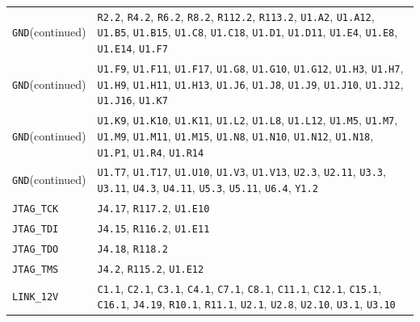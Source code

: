 \documentclass[11pt,a4paper]{article}
\begin{document}
\begin{longtable}{@{}P{49mm}P{123mm}@{}}
\nolinkurl{GND}\newline (continued) & \nolinkurl{R2.2}, \nolinkurl{R4.2}, \nolinkurl{R6.2}, \nolinkurl{R8.2}, \nolinkurl{R112.2}, \nolinkurl{R113.2}, \nolinkurl{U1.A2}, \nolinkurl{U1.A12}, \nolinkurl{U1.B5}, \nolinkurl{U1.B15}, \nolinkurl{U1.C8}, \nolinkurl{U1.C18}, \nolinkurl{U1.D1}, \nolinkurl{U1.D11}, \nolinkurl{U1.E4}, \nolinkurl{U1.E8}, \nolinkurl{U1.E14}, \nolinkurl{U1.F7} \\
\nolinkurl{GND}\newline (continued) & \nolinkurl{U1.F9}, \nolinkurl{U1.F11}, \nolinkurl{U1.F17}, \nolinkurl{U1.G8}, \nolinkurl{U1.G10}, \nolinkurl{U1.G12}, \nolinkurl{U1.H3}, \nolinkurl{U1.H7}, \nolinkurl{U1.H9}, \nolinkurl{U1.H11}, \nolinkurl{U1.H13}, \nolinkurl{U1.J6}, \nolinkurl{U1.J8}, \nolinkurl{U1.J9}, \nolinkurl{U1.J10}, \nolinkurl{U1.J12}, \nolinkurl{U1.J16}, \nolinkurl{U1.K7} \\
\nolinkurl{GND}\newline (continued) & \nolinkurl{U1.K9}, \nolinkurl{U1.K10}, \nolinkurl{U1.K11}, \nolinkurl{U1.L2}, \nolinkurl{U1.L8}, \nolinkurl{U1.L12}, \nolinkurl{U1.M5}, \nolinkurl{U1.M7}, \nolinkurl{U1.M9}, \nolinkurl{U1.M11}, \nolinkurl{U1.M15}, \nolinkurl{U1.N8}, \nolinkurl{U1.N10}, \nolinkurl{U1.N12}, \nolinkurl{U1.N18}, \nolinkurl{U1.P1}, \nolinkurl{U1.R4}, \nolinkurl{U1.R14} \\
\nolinkurl{GND}\newline (continued) & \nolinkurl{U1.T7}, \nolinkurl{U1.T17}, \nolinkurl{U1.U10}, \nolinkurl{U1.V3}, \nolinkurl{U1.V13}, \nolinkurl{U2.3}, \nolinkurl{U2.11}, \nolinkurl{U3.3}, \nolinkurl{U3.11}, \nolinkurl{U4.3}, \nolinkurl{U4.11}, \nolinkurl{U5.3}, \nolinkurl{U5.11}, \nolinkurl{U6.4}, \nolinkurl{Y1.2} \\
\nolinkurl{JTAG_TCK} & \nolinkurl{J4.17}, \nolinkurl{R117.2}, \nolinkurl{U1.E10} \\
\nolinkurl{JTAG_TDI} & \nolinkurl{J4.15}, \nolinkurl{R116.2}, \nolinkurl{U1.E11} \\
\nolinkurl{JTAG_TDO} & \nolinkurl{J4.18}, \nolinkurl{R118.2} \\
\nolinkurl{JTAG_TMS} & \nolinkurl{J4.2}, \nolinkurl{R115.2}, \nolinkurl{U1.E12} \\
\nolinkurl{LINK_12V} & \nolinkurl{C1.1}, \nolinkurl{C2.1}, \nolinkurl{C3.1}, \nolinkurl{C4.1}, \nolinkurl{C7.1}, \nolinkurl{C8.1}, \nolinkurl{C11.1}, \nolinkurl{C12.1}, \nolinkurl{C15.1}, \nolinkurl{C16.1}, \nolinkurl{J4.19}, \nolinkurl{R10.1}, \nolinkurl{R11.1}, \nolinkurl{U2.1}, \nolinkurl{U2.8}, \nolinkurl{U2.10}, \nolinkurl{U3.1}, \nolinkurl{U3.10} \\

\end{longtable}
\end{document}
